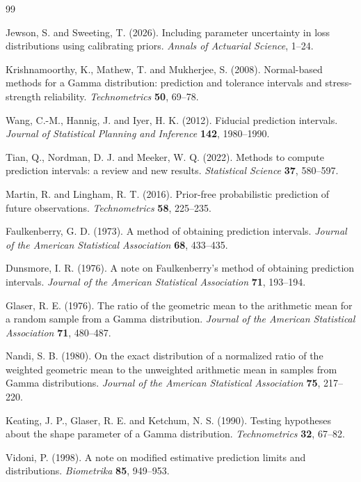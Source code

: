 \documentclass[11pt]{article}
\theoremstyle{remark}
\begin{document}
\begin{thebibliography}{99}
\small

Jewson, S. and Sweeting, T. (2026). Including parameter uncertainty in loss distributions using calibrating priors. \emph{Annals of Actuarial Science}, 1--24.

Krishnamoorthy, K., Mathew, T. and Mukherjee, S. (2008). Normal-based methods for a Gamma distribution: prediction and tolerance intervals and stress-strength reliability. \emph{Technometrics} \textbf{50}, 69--78.

Wang, C.-M., Hannig, J. and Iyer, H. K. (2012). Fiducial prediction intervals. \emph{Journal of Statistical Planning and Inference} \textbf{142}, 1980--1990.

Tian, Q., Nordman, D. J. and Meeker, W. Q. (2022). Methods to compute prediction intervals: a review and new results. \emph{Statistical Science} \textbf{37}, 580--597.

Martin, R. and Lingham, R. T. (2016). Prior-free probabilistic prediction of future observations. \emph{Technometrics} \textbf{58}, 225--235.

Faulkenberry, G. D. (1973). A method of obtaining prediction intervals. \emph{Journal of the American Statistical Association} \textbf{68}, 433--435.

Dunsmore, I. R. (1976). A note on Faulkenberry's method of obtaining prediction intervals. \emph{Journal of the American Statistical Association} \textbf{71}, 193--194.

Glaser, R. E. (1976). The ratio of the geometric mean to the arithmetic mean for a random sample from a Gamma distribution. \emph{Journal of the American Statistical Association} \textbf{71}, 480--487.

Nandi, S. B. (1980). On the exact distribution of a normalized ratio of the weighted geometric mean to the unweighted arithmetic mean in samples from Gamma distributions. \emph{Journal of the American Statistical Association} \textbf{75}, 217--220.

Keating, J. P., Glaser, R. E. and Ketchum, N. S. (1990). Testing hypotheses about the shape parameter of a Gamma distribution. \emph{Technometrics} \textbf{32}, 67--82.

Vidoni, P. (1998). A note on modified estimative prediction limits and distributions. \emph{Biometrika} \textbf{85}, 949--953.


\end{thebibliography}
\end{document}
